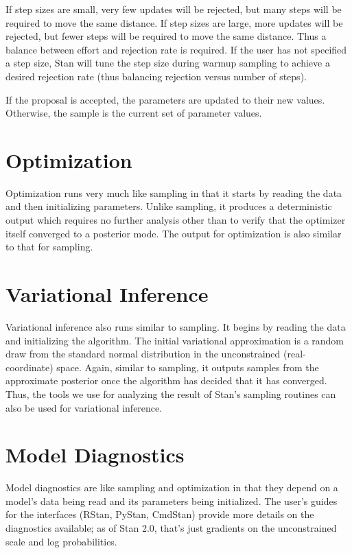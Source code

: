 If step sizes are small, very few updates will be rejected, but many
steps will be required to move the same distance.  If step sizes are
large, more updates will be rejected, but fewer steps will be required
to move the same distance.  Thus a balance between effort and
rejection rate is required.  If the user has not specified a step
size, Stan will tune the step size during warmup sampling to achieve
a desired rejection rate (thus balancing rejection versus number of
steps).

If the proposal is accepted, the parameters are updated to their new
values.  Otherwise, the sample is the current set of parameter values.


\section{Optimization}

Optimization runs very much like sampling in that it starts by reading
the data and then initializing parameters.  Unlike sampling, it
produces a deterministic output which requires no further analysis
other than to verify that the optimizer itself converged to a
posterior mode.  The output for optimization is also similar to that
for sampling.


\section{Variational Inference}

Variational inference also runs similar to sampling. It begins by reading the
data and initializing the algorithm. The initial variational approximation is a
random draw from the standard normal distribution in the unconstrained
(real-coordinate) space. Again, similar to sampling, it outputs samples from the
approximate posterior once the algorithm has decided that it has converged.
Thus, the tools we use for analyzing the result of Stan's sampling routines can
also be used for variational inference.



\section{Model Diagnostics}

Model diagnostics are like sampling and optimization in that they
depend on a model's data being read and its parameters being
initialized.  The user's guides for the interfaces (RStan, PyStan,
CmdStan) provide more details on the diagnostics available; as of Stan
2.0, that's just gradients on the unconstrained scale and log
probabilities.

